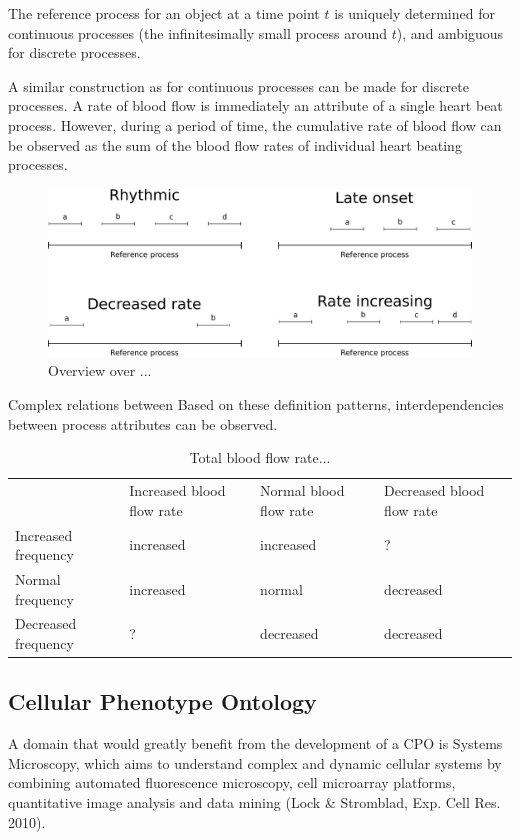 \documentclass{bioinfo}
\begin{document}
The reference process for an object at a time point $t$ is uniquely
determined for continuous processes (the infinitesimally small process
around $t$), and ambiguous for discrete processes.


A similar construction as for continuous processes can be made for
discrete processes. A rate of blood flow is immediately an attribute
of a single heart beat process. However, during a period of time, the
cumulative rate of blood flow can be observed as the sum of the blood
flow rates of individual heart beating processes.

\begin{figure}
  \centering
  \includegraphics[width=.5\textwidth]{processpatterns.pdf}
  \caption{Overview over ...\label{fig:patterns}}
\end{figure}

Complex relations between Based on these definition patterns,
interdependencies between process attributes can be observed.

\begin{table}
  \begin{tabular}{l|l|l|l}
    & Increased blood flow rate & Normal blood flow rate & Decreased
    blood flow rate \\
    Increased frequency &increased&increased&?\\
    Normal frequency &increased&normal&decreased\\
    Decreased frequency &?&decreased&decreased
  \end{tabular}
  \caption{\label{...}Total blood flow rate...}
\end{table}


\subsection{Cellular Phenotype Ontology}

A domain that would greatly benefit from the development of a CPO is
Systems Microscopy, which aims to understand complex and dynamic
cellular systems by combining automated fluorescence microscopy, cell
microarray platforms, quantitative image analysis and data mining
(Lock \& Stromblad, Exp. Cell Res. 2010).
\end{document}
